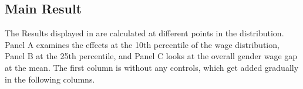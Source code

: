 \documentclass[12pt,draft,a4paper]{article}
\begin{document}
\subsection{Main Result}




The Results displayed in  are calculated at different points in the distribution. Panel A examines the effects at the 10th percentile of the wage distribution, Panel B at the 25th percentile, and Panel C looks at the overall gender wage gap at the mean. The first column is without any controls, which get added gradually in the following columns.  
\end{document}
